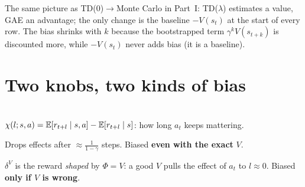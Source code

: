 \begin{notebox}
The same picture as TD(0)$\to$Monte Carlo in Part~I: TD($\lambda$) estimates a value, GAE an advantage; the only change is the baseline $-V(s_t)$ at the start of every row. The bias shrinks with $k$ because the bootstrapped term $\gamma^kV(s_{t+k})$ is discounted more, while $-V(s_t)$ never adds bias (it is a baseline).
\end{notebox}

\section{Two knobs, two kinds of bias}

\begin{minipage}[c]{0.5\linewidth}
\centering
{}\\
{\scriptsize $\chi(l;s,a)=\mathbb{E}[r_{t+l}\mid s,a]-\mathbb{E}[r_{t+l}\mid s]$: how long $a_t$ keeps mattering.}
\end{minipage}\hfill
\begin{minipage}[c]{0.47\linewidth}
\begin{pair}[1]
\begin{slatebox}[title={$\gamma$: cut the horizon}]
\small Drops effects after $\approx\frac{1}{1-\gamma}$ steps. Biased \textbf{even with the exact} $V$.
\end{slatebox}
\begin{warmbox}[title={$\lambda$: shape, then cut again}]
\small $\delta^V$ is the reward \emph{shaped} by $\Phi=V$: a good $V$ pulls the effect of $a_t$ to $l\approx0$. Biased \textbf{only if $V$ is wrong}.
\end{warmbox}
\end{pair}
\end{minipage}

